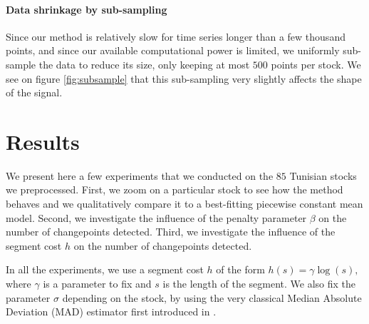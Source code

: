 \documentclass[11pt]{article}
\begin{document}
\paragraph*{Data shrinkage by sub-sampling} Since our method is relatively slow for time series longer than a few thousand points, and since our available computational power is limited, we uniformly sub-sample the data to reduce its size, only keeping at most $500$ points per stock. We see on figure \ref{fig:subsample} that this sub-sampling very slightly affects the shape of the signal.

\section{Results}
We present here a few experiments that we conducted on the $85$ Tunisian stocks we preprocessed. First, we zoom on a particular stock to see how the method behaves and we qualitatively compare it to a best-fitting piecewise constant mean model. Second, we investigate the influence of the penalty parameter $\beta$ on the number of changepoints detected. Third, we investigate the influence of the segment cost $h$ on the number of changepoints detected.

In all the experiments, we use a segment cost $h$ of the form $ h(s) = \gamma \log(s), $ where $\gamma$ is a parameter to fix and $s$ is the length of the segment. We also fix the parameter $\sigma$ depending on the stock, by using the very classical Median Absolute Deviation (MAD) estimator first introduced in \cite{hampel1974}.
\end{document}
